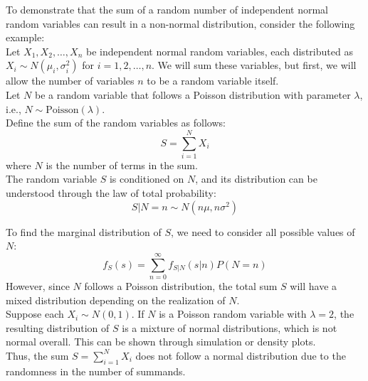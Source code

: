 \begin{solution}
To demonstrate that the sum of a random number of independent normal random variables can result in a non-normal distribution, consider the following example:\\

Let \(X_1, X_2, \ldots, X_n\) be independent normal random variables, each distributed as \(X_i \sim N(\mu_i, \sigma_i^2)\) for \(i = 1, 2, \ldots, n\). We will sum these variables, but first, we will allow the number of variables \(n\) to be a random variable itself.\\

Let \(N\) be a random variable that follows a Poisson distribution with parameter \(\lambda\), i.e., \(N \sim \text{Poisson}(\lambda)\).\\

Define the sum of the random variables as follows:
   \[
   S = \sum_{i=1}^{N} X_i
   \]
   where \(N\) is the number of terms in the sum.\\

The random variable \(S\) is conditioned on \(N\), and its distribution can be understood through the law of total probability:
   \[
   S | N = n \sim N\left(n \mu, n \sigma^2\right)
   \]

To find the marginal distribution of \(S\), we need to consider all possible values of \(N\):
   \[
   f_S(s) = \sum_{n=0}^{\infty} f_{S | N}(s | n) P(N = n)
   \]
   However, since \(N\) follows a Poisson distribution, the total sum \(S\) will have a mixed distribution depending on the realization of \(N\).\\

Suppose each \(X_i \sim N(0, 1)\). If \(N\) is a Poisson random variable with \(\lambda = 2\), the resulting distribution of \(S\) is a mixture of normal distributions, which is not normal overall. This can be shown through simulation or density plots.\\

Thus, the sum \(S = \sum_{i=1}^{N} X_i\) does not follow a normal distribution due to the randomness in the number of summands.
\end{solution}
